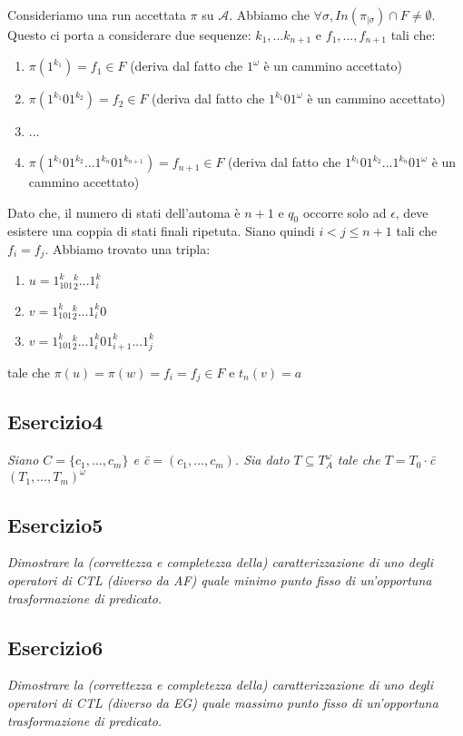 \documentclass[12pt]{article}
\newcommand{\A}{\ensuremath{\mathcal{A}}\xspace}
\begin{document}
Consideriamo una run accettata $\pi$ su $\A$. Abbiamo che $\forall \sigma, In(\pi_{|\sigma}) \cap F \neq \emptyset$. Questo ci porta a considerare due sequenze: $k_1,...k_{n+1}$ e $f_1,...,f_{n+1}$ tali che:
\begin{enumerate}
\item $\pi(1^{k_1}) = f_1 \in F$ (deriva dal fatto che $1^\omega$ è un cammino accettato)
\item $\pi(1^{k_1}01^{k_2}) = f_2 \in F$ (deriva dal fatto che $1^{k_1}01^\omega$ è un cammino accettato)
\item ...
\item $\pi(1^{k_1}01^{k_2}...1^{k_n}01^{k_{n+1}}) = f_{n+1} \in F$ (deriva dal fatto che $1^{k_1}01^{k_2}...1^{k_n}01^\omega$ è un cammino accettato)
\end{enumerate}

Dato che, il numero di stati dell'automa è $n+1$ e $q_0$ occorre solo ad $\epsilon$, deve esistere una coppia di stati finali ripetuta. Siano quindi $i<j\leq n+1$ tali che $f_i=f_j$. Abbiamo trovato una tripla:
\begin{enumerate}
\item $u=1^k_101^k_2...1^k_i$
\item $v=1^k_101^k_2...1^k_i0$
\item $v=1^k_101^k_2...1^k_i01^k_{i+1}...1^k_j$
\end{enumerate} 
tale che $\pi(u)=\pi(w)=f_i=f_j \in F$ e $t_n(v)=a$ 

\subsection*{Esercizio4}
\textit{Siano $C=\{c_1,\ldots,c_m\}$ e \=c$= ( c_1,\ldots,c_m) $. Sia dato $T \subseteq T^{\omega}_A$ tale che $T=T_0 \cdot$\=c$(T_1,\ldots,T_m)^{\omega}$}


\subsection*{Esercizio5}
\textit{Dimostrare la (correttezza e completezza della) caratterizzazione di uno degli operatori di CTL (diverso da AF) quale minimo punto fisso di un’opportuna trasformazione di predicato.}


\subsection*{Esercizio6}
\textit{Dimostrare la (correttezza e completezza della) caratterizzazione di uno degli operatori di CTL (diverso da EG) quale massimo punto fisso di un’opportuna trasformazione di predicato.}
\end{document}
